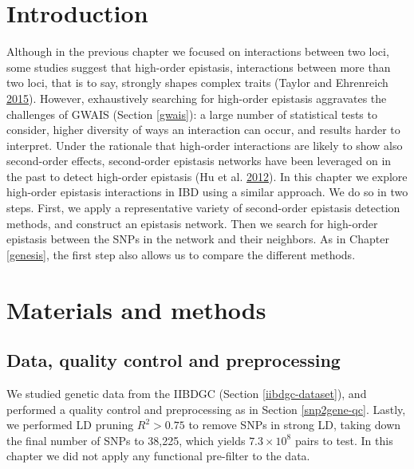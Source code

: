 \documentclass[
  11pt,
]{env/yjiao}
\begin{document}
\hypertarget{introduction-3}{%
\section{Introduction}\label{introduction-3}}

Although in the previous chapter we focused on interactions between two loci, some studies suggest that high-order epistasis, interactions between more than two loci, that is to say, strongly shapes complex traits (Taylor and Ehrenreich \protect\hyperlink{ref-taylor_higher-order_2015}{2015}). However, exhaustively searching for high-order epistasis aggravates the challenges of GWAIS (Section \ref{gwais}): a large number of statistical tests to consider, higher diversity of ways an interaction can occur, and results harder to interpret. Under the rationale that high-order interactions are likely to show also second-order effects, second-order epistasis networks have been leveraged on in the past to detect high-order epistasis (Hu et al. \protect\hyperlink{ref-hu_statistical_2012}{2012}). In this chapter we explore high-order epistasis interactions in IBD using a similar approach. We do so in two steps. First, we apply a representative variety of second-order epistasis detection methods, and construct an epistasis network. Then we search for high-order epistasis between the SNPs in the network and their neighbors. As in Chapter \ref{genesis}, the first step also allows us to compare the different methods.

\hypertarget{materials-and-methods-1}{%
\section{Materials and methods}\label{materials-and-methods-1}}

\hypertarget{data-quality-control-and-preprocessing}{%
\subsection{Data, quality control and preprocessing}\label{data-quality-control-and-preprocessing}}

We studied genetic data from the IIBDGC (Section \ref{iibdgc-dataset}), and performed a quality control and preprocessing as in Section \ref{snp2gene-qc}. Lastly, we performed LD pruning \(R^{2}>0.75\) to remove SNPs in strong LD, taking down the final number of SNPs to 38,225, which yields \(7.3 \times 10^8\) pairs to test. In this chapter we did not apply any functional pre-filter to the data.
\end{document}
